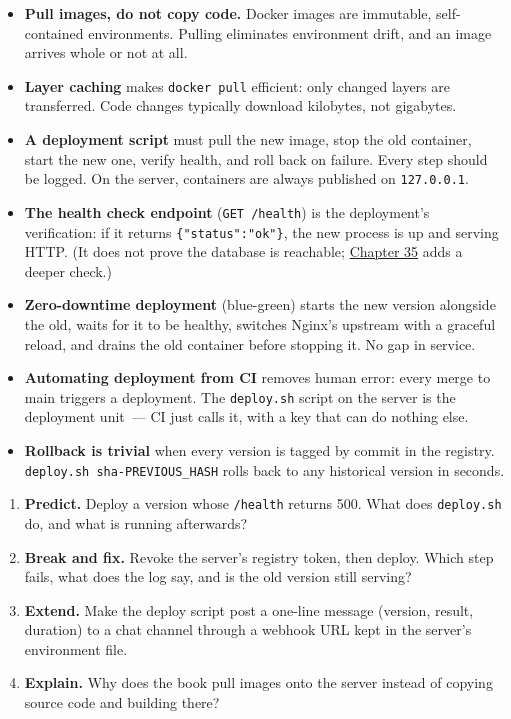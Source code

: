 \label{23-code-transfer:key-takeaways}
\begin{takeaways}

\begin{itemize}
\tightlist
\item
  \textbf{Pull images, do not copy code.} Docker images are immutable, self-contained environments. Pulling eliminates environment drift, and an image arrives whole or not at all.
\item
  \textbf{Layer caching} makes \texttt{docker\ pull} efficient: only changed layers are transferred. Code changes typically download kilobytes, not gigabytes.
\item
  \textbf{A deployment script} must pull the new image, stop the old container, start the new one, verify health, and roll back on failure. Every step should be logged. On the server, containers are always published on \texttt{127.0.0.1}.
\item
  \textbf{The health check endpoint} (\texttt{GET\ /health}) is the deployment's verification: if it returns \texttt{\{"status":"ok"\}}, the new process is up and serving HTTP. (It does not prove the database is reachable; \hyperref[ch:35-observability]{Chapter 35} adds a deeper check.)
\item
  \textbf{Zero-downtime deployment} (blue-green) starts the new version alongside the old, waits for it to be healthy, switches Nginx's upstream with a graceful reload, and drains the old container before stopping it. No gap in service.
\item
  \textbf{Automating deployment from CI} removes human error: every merge to main triggers a deployment. The \texttt{deploy.sh} script on the server is the deployment unit~--- CI just calls it, with a key that can do nothing else.
\item
  \textbf{Rollback is trivial} when every version is tagged by commit in the registry. \texttt{deploy.}\allowbreak{}\texttt{sh\ sha-}\allowbreak{}\texttt{PREVIOUS\_}\allowbreak{}\texttt{HASH} rolls back to any historical version in seconds.
\end{itemize}

\end{takeaways}

\label{23-code-transfer:exercises}

\begin{enumerate}
\def\labelenumi{\arabic{enumi}.}
\tightlist
\item
  \textbf{Predict.} Deploy a version whose \texttt{/health} returns 500. What does \texttt{deploy.sh} do, and what is running afterwards?
\item
  \textbf{Break and fix.} Revoke the server's registry token, then deploy. Which step fails, what does the log say, and is the old version still serving?
\item
  \textbf{Extend.} Make the deploy script post a one-line message (version, result, duration) to a chat channel through a webhook URL kept in the server's environment file.
\item
  \textbf{Explain.} Why does the book pull images onto the server instead of copying source code and building there?
\end{enumerate}

